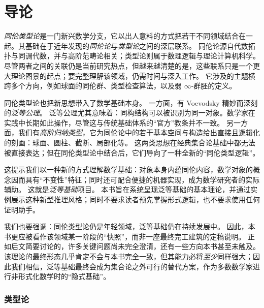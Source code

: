 \chapter*{导论}
\setcounter{page}{1}


\emph{同伦类型论}是一门新兴数学分支，它以出人意料的方式把若干不同领域结合在一起。其基础在于近年发现的\emph{同伦论}与\emph{类型论}之间的深层联系。
同伦论源自代数拓扑与同调代数，并与高阶范畴论相关；类型论则属于数理逻辑与理论计算机科学。
尽管两者之间的关联仍是当前研究热点，但越来越清楚的是，这些联系只是一个更大理论图景的起点；要完整理解该领域，仍需时间与深入工作。
它涉及的主题横跨多个方向，例如球面的同伦群、类型检查算法，以及弱 $\infty$-群胚的定义。

同伦类型论也把新思想带入了数学基础本身。
%
一方面，有 Voevodsky 精妙而深刻的\emph{泛等公理}。
%
泛等公理尤其意味着：同构结构可以被识别为同一对象。数学家在实践中长期如此操作，尽管这与传统基础体系的“官方”教条并不一致。
另一方面，我们有\emph{高阶归纳类型}，它为同伦论中的若干基本空间与构造给出直接且逻辑化的刻画：球面、圆柱、截断、局部化等。
这两类思想在经典集合论基础中都无法被直接表达；但在同伦类型论中结合后，它们导向了一种全新的“同伦类型逻辑”。
%

这提示我们以一种新的方式理解数学基础：对象本身内蕴同伦内容，数学对象的概念因而具有“不变性”特征；同时还可配合便捷的机器实现，成为数学研究者的实际辅助。
这就是\emph{泛等基础}项目。
本书旨在系统呈现泛等基础的基本理论，并通过实例展示这种新型推理风格；同时不要求读者预先掌握形式逻辑，也不要求使用任何证明助手。

\OPTwidow

我们也要强调：同伦类型论仍是年轻领域，泛等基础仍在持续发展中。
因此，本书更应被看作该领域某一阶段的“快照”，而非一座最终完工建筑的定稿说明。
正如后文简要讨论的，许多关键问题尚未完全澄清，还有一些方向本书甚至未触及。
该理论的最终形态几乎肯定不会与本书完全一致，但其能力必将\emph{至少}同样强大；因此我们相信，泛等基础最终会成为集合论之外可行的替代方案，作为多数数学家进行非形式化数学时的“隐式基础”。

\subsection*{类型论}

